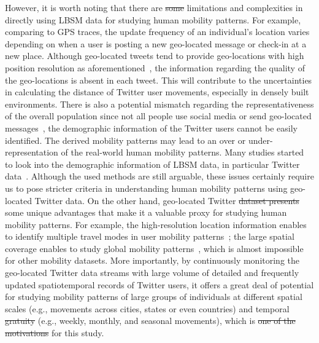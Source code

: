 \documentclass[ijgi,article,accept,moreauthors,pdftex,10pt,a4paper]{mdpi}
\theoremstyle{mdpi}
\newcounter{ex}
\newcounter{re}
\theoremstyle{mdpidefinition}
\providecommand{\DIFadd}[1]{{\protect\color{blue}\uwave{#1}}} %
\providecommand{\DIFdel}[1]{{\protect\color{red}\sout{#1}}}                      %
\providecommand{\DIFaddbegin}{} %
\providecommand{\DIFaddend}{} %
\providecommand{\DIFdelbegin}{} %
\providecommand{\DIFdelend}{} %
\begin{document}
However, it is worth noting that there are \DIFdelbegin \DIFdel{some }\DIFdelend limitations and complexities in directly using LBSM data for studying human mobility patterns.
For example, comparing to GPS traces, the update frequency of an individual's location varies depending on when a user is posting a new geo-located message or check-in at a new place.
Although geo-located tweets tend to provide geo-locations with high position resolution as aforementioned~\cite{Jurdak2015}, the information regarding the quality of the geo-locations is absent in each tweet.
This will contribute to the uncertainties in calculating the distance of Twitter user movements, especially in densely built environments.   
There is also a potential mismatch regarding the representativeness of the overall population since not all people use social media or send geo-located messages~\cite{kung2014exploring}, the demographic information of the Twitter users cannot be easily identified.
The derived mobility patterns may lead to an over or under-representation of the real-world human mobility patterns.
Many studies started to look into the demographic information of LBSM data, in particular Twitter data~\cite{mitchell2013geography,longley2015geotemporal}.
Although the used methods are still arguable, these issues certainly require us to pose stricter criteria in understanding human mobility patterns using geo-located Twitter data.
On the other hand, geo-located Twitter \DIFdelbegin \DIFdel{dataset presents }\DIFdelend \DIFaddbegin \DIFadd{data present }\DIFaddend some unique advantages that make it a valuable proxy for studying human mobility patterns.
For example, the high-resolution location information enables to identify multiple travel modes in user mobility patterns~\cite{Jurdak2015}; the large spatial coverage enables to study global mobility patterns~\cite{hawelka2014geo}, which is almost impossible for other mobility datasets.
More importantly, by continuously monitoring the geo-located Twitter data streams with large volume of detailed and frequently updated spatiotemporal records of Twitter users, it offers a great deal of potential for studying mobility patterns of large groups of individuals at different spatial scales (e.g., movements across cities, states or even countries) and temporal \DIFdelbegin \DIFdel{gratuity }\DIFdelend \DIFaddbegin \DIFadd{granularity }\DIFaddend (e.g., weekly, monthly, and seasonal movements), which is \DIFdelbegin \DIFdel{one of the motivations }\DIFdelend \DIFaddbegin \DIFadd{a key motivation }\DIFaddend for this study.
\end{document}

